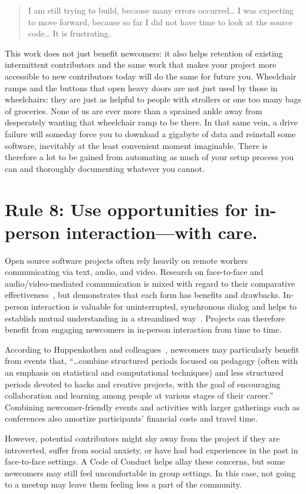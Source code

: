 \documentclass[10pt,letterpaper]{article}
\newcommand{\rulemajor}[1]{\section*{#1}}
\begin{document}
\begin{quote}
  I am still trying to build, because many errors occurred{\ldots}
  I was expecting to move forward,
  because so far I did not have time to look at the source code{\ldots}
  It is frustrating.
\end{quote}

This work does not just benefit newcomers:
it also helps retention of existing intermittent contributors and the same work that makes your project more
accessible to new contributors today will do the same for future you.
Wheelchair ramps and the buttons that open heavy doors are not just used by those in wheelchairs:
they are just as helpful to people with strollers or one too many bags of groceries.
None of us are ever more than a sprained ankle away from desperately wanting that wheelchair ramp to be there.
In that same vein, a drive failure will someday force you to download a gigabyte of data
and reinstall some software, inevitably at the least convenient moment imaginable.
There is therefore a lot to be gained from automating as much of your setup process you can
and thoroughly documenting whatever you cannot.

\rulemajor{Rule 8: Use opportunities for in-person interaction---with care.}

Open source software projects often rely heavily on remote workers communicating via text, audio, and video.
Research on face-to-face and audio/video-mediated communication is mixed
with regard to their comparative effectiveness~\cite{doherty1997,gallupe1990,nardi2002},
but demonstrates that each form has benefits and drawbacks.
In-person interaction is valuable for uninterrupted, synchronous dialog
and helps to establish mutual understanding in a streamlined way~\cite{omalley1996}.
Projects can therefore benefit from engaging newcomers in in-person interaction from time to time.

According to Huppenkothen and colleagues~\cite{huppenkothen2018},
newcomers may particularly benefit from events that,
``{\ldots}combine structured periods focused on pedagogy
(often with an emphasis on statistical and computational techniques)
and less structured periods devoted to hacks and creative projects,
with the goal of encouraging collaboration and learning among people at various stages of their career.''
Combining newcomer-friendly events and activities with larger gatherings such as conferences
also amortize participants' financial costs and travel time.

However,
potential contributors might shy away from the project if they are introverted,
suffer from social anxiety,
or have had bad experiences in the past in face-to-face settings.
A Code of Conduct helps allay these concerns,
but some newcomers may still feel uncomfortable in group settings.
In this case,
not going to a meetup may leave them feeling less a part of the community.
\end{document}
